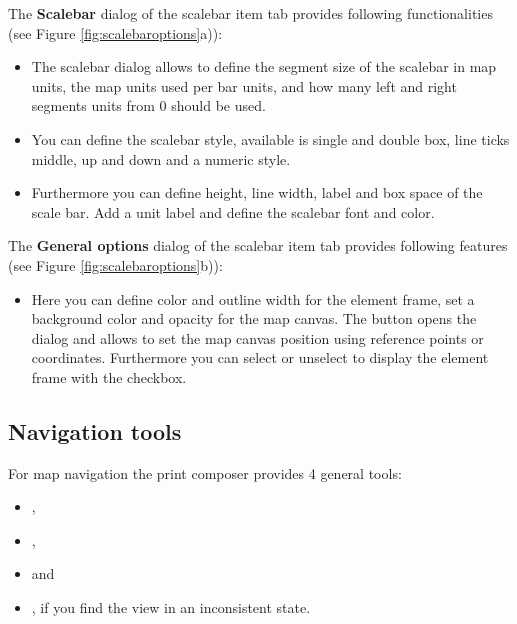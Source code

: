 
The \textbf{Scalebar} dialog of the scalebar item tab provides following
functionalities (see Figure \ref{fig:scalebaroptions}a)):

\begin{itemize}
\item The scalebar dialog allows to define the segment size of the scalebar
in map units, the map units used per bar units, and how many left and right
segments units from 0 should be used.
\item You can define the scalebar style, available is single and double box,
line ticks middle, up and down and a numeric style.
\item Furthermore you can define height, line width, label and box space of
the scale bar. Add a unit label and define the scalebar font and color.
\end{itemize}


The \textbf{General options} dialog of the scalebar item tab provides following
features (see Figure \ref{fig:scalebaroptions}b)):

\begin{itemize}
\item Here you can define color and outline width for the element frame, set
a background color and opacity for the map canvas. The 
button opens the  dialog and allows to set the map
canvas position using reference points or coordinates. Furthermore you can
select or unselect to display the element frame with the  checkbox.
\end{itemize}

\subsection{Navigation tools}

For map navigation the print composer provides 4 general tools:

\begin{itemize}
\item {},
\item {},
\item {} and
\item {}, if you find the view in an
inconsistent state.
\end{itemize}

